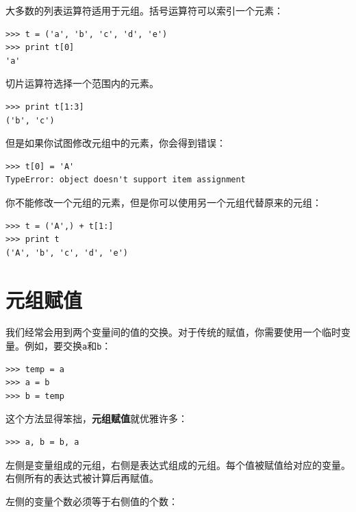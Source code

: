 大多数的列表运算符适用于元组。括号运算符可以索引一个元素：


\beforeverb
\begin{verbatim}
>>> t = ('a', 'b', 'c', 'd', 'e')
>>> print t[0]
'a'
\end{verbatim}
\afterverb
%
切片运算符选择一个范围内的元素。


\beforeverb
\begin{verbatim}
>>> print t[1:3]
('b', 'c')
\end{verbatim}
\afterverb
%
但是如果你试图修改元组中的元素，你会得到错误：


\beforeverb
\begin{verbatim}
>>> t[0] = 'A'
TypeError: object doesn't support item assignment
\end{verbatim}
\afterverb
%
你不能修改一个元组的元素，但是你可以使用另一个元组代替原来的元组：

\beforeverb
\begin{verbatim}
>>> t = ('A',) + t[1:]
>>> print t
('A', 'b', 'c', 'd', 'e')
\end{verbatim}
\afterverb
%

\section{元组赋值}
\label{元组赋值}


我们经常会用到两个变量间的值的交换。对于传统的赋值，你需要使用一个临时变量。例如，要交换{\tt a}和{\tt b}：

\beforeverb
\begin{verbatim}
>>> temp = a
>>> a = b
>>> b = temp
\end{verbatim}
\afterverb
%
这个方法显得笨拙，{\bf 元组赋值}就优雅许多：

\beforeverb
\begin{verbatim}
>>> a, b = b, a
\end{verbatim}
\afterverb
%
左侧是变量组成的元组，右侧是表达式组成的元组。每个值被赋值给对应的变量。右侧所有的表达式被计算后再赋值。

左侧的变量个数必须等于右侧值的个数：

